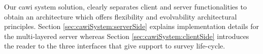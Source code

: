 	Our \gls{cawi} system solution, clearly separates client and server functionalities to obtain an architecture which offers flexibility and evolvability architectural principles. Section \ref{sec:cawiSystem:serverSide} explains implementation details for the multi-layered server whereas Section \ref{sec:cawiSystem:clientSide} introduces the reader to the three interfaces that give support to survey life-cycle.